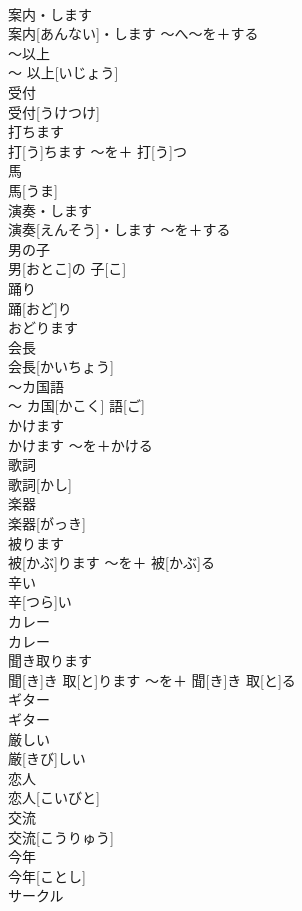\documentclass[8pt]{extreport}
\begin{document}
\begin{CJK}{UTF8}{min}
\\	案内・します	
\\	案内[あんない]・します	〜へ〜を＋する	
\\	〜以上	
\\	〜 以上[いじょう]		
\\	受付	
\\	受付[うけつけ]		
\\	打ちます	
\\	打[う]ちます	〜を＋ 打[う]つ	
\\	馬	
\\	馬[うま]		
\\	演奏・します	
\\	演奏[えんそう]・します	〜を＋する	
\\	男の子	
\\	男[おとこ]の 子[こ]		
\\	踊り	
\\	踊[おど]り	
\\	おどります 
\\	会長	
\\	会長[かいちょう]		
\\	〜カ国語	
\\	〜 カ国[かこく] 語[ご]		
\\	かけます	
\\	かけます	〜を＋かける	
\\	歌詞	
\\	歌詞[かし]		
\\	楽器	
\\	楽器[がっき]		
\\	被ります	
\\	被[かぶ]ります	〜を＋ 被[かぶ]る	
\\	辛い	
\\	辛[つら]い		
\\	カレー	
\\	カレー		
\\	聞き取ります	
\\	聞[き]き 取[と]ります	〜を＋ 聞[き]き 取[と]る	
\\	ギター	
\\	ギター		
\\	厳しい	
\\	厳[きび]しい		
\\	恋人	
\\	恋人[こいびと]		
\\	交流	
\\	交流[こうりゅう]		
\\	今年	
\\	今年[ことし]		
\\	サークル	

\end{CJK}
\end{document}
